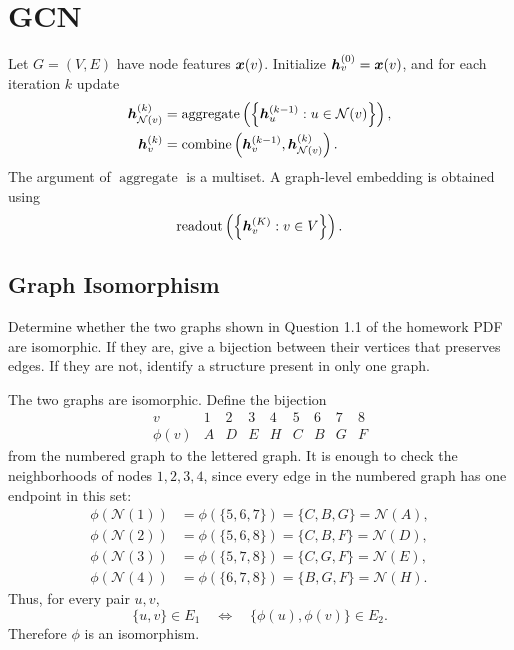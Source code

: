 \section{GCN}

Let \(G=(V,E)\) have node features \(\bm{x}(v)\). Initialize
\(\bm{h}_v^{(0)}=\bm{x}(v)\), and for each iteration \(k\) update
\begin{align*}
  \bm{h}_{\mathcal N(v)}^{(k)}
    &=\operatorname{aggregate}
      \left(\left\{\bm{h}_u^{(k-1)}:u\in\mathcal N(v)\right\}\right),\\
  \bm{h}_v^{(k)}
    &=\operatorname{combine}
      \left(\bm{h}_v^{(k-1)},
            \bm{h}_{\mathcal N(v)}^{(k)}\right).
\end{align*}
The argument of \(\operatorname{aggregate}\) is a multiset. A graph-level
embedding is obtained using
\[
  \operatorname{readout}
  \left(\left\{\bm{h}_v^{(K)}:v\in V\right\}\right).
\]

\subsection{Graph Isomorphism}

Determine whether the two graphs shown in Question 1.1 of the homework PDF are
isomorphic. If they are, give a bijection between their vertices that preserves
edges. If they are not, identify a structure present in only one graph.

\begin{solution}
The two graphs are isomorphic.  Define the bijection
\[
\begin{array}{c|cccccccc}
  v & 1&2&3&4&5&6&7&8\\ \hline
  \phi(v)&A&D&E&H&C&B&G&F
\end{array}
\]
from the numbered graph to the lettered graph.  It is enough to check the
neighborhoods of nodes \(1,2,3,4\), since every edge in the numbered graph
has one endpoint in this set:
\begin{align*}
  \phi(\mathcal N(1))
    &=\phi(\{5,6,7\})=\{C,B,G\}=\mathcal N(A),\\
  \phi(\mathcal N(2))
    &=\phi(\{5,6,8\})=\{C,B,F\}=\mathcal N(D),\\
  \phi(\mathcal N(3))
    &=\phi(\{5,7,8\})=\{C,G,F\}=\mathcal N(E),\\
  \phi(\mathcal N(4))
    &=\phi(\{6,7,8\})=\{B,G,F\}=\mathcal N(H).
\end{align*}
Thus, for every pair \(u,v\),
\[
  \{u,v\}\in E_1
  \quad\Longleftrightarrow\quad
  \{\phi(u),\phi(v)\}\in E_2.
\]
Therefore \(\phi\) is an isomorphism.
\end{solution}


